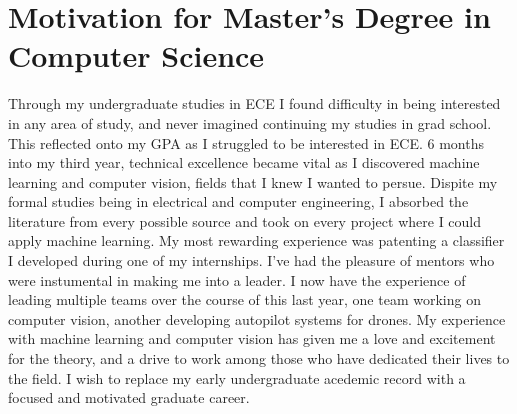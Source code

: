 \documentclass[letterpaper,10pt,titlepage]{article}
\date{14 April 2016}
\begin{document}
\section{Motivation for Master's Degree in Computer Science}
    \author{Neale Ratzlaff}

    Through my undergraduate studies in ECE I found difficulty in being interested in any area of study, and never imagined continuing my studies in grad school. This reflected onto my GPA as I struggled to be interested in ECE. 
    6 months into my third year, technical excellence became vital as I discovered machine learning and computer vision, fields that I knew I wanted to persue. 
    Dispite my formal studies being in electrical and computer engineering, I absorbed the literature from every possible source and took on every project where I could apply machine learning. 
    My most rewarding experience was patenting a classifier I developed during one of my internships. I've had the pleasure of mentors who were instumental in making me into a leader.
    I now have the experience of leading multiple teams over the course of this last year, one team working on computer vision, another developing autopilot systems for drones. 
    My experience with machine learning and computer vision has given me a love and excitement for the theory, and a drive to work among those who have dedicated their lives to the field. I wish to replace my early undergraduate acedemic record with a focused and motivated graduate career.
  
\end{document}
